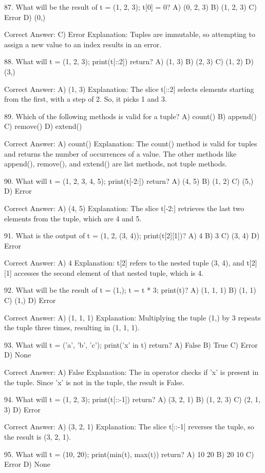 87. What will be the result of t = (1, 2, 3); t[0] = 0?
A) (0, 2, 3)
B) (1, 2, 3)
C) Error
D) (0,)

Correct Answer: C) Error
Explanation: Tuples are immutable, so attempting to assign a new value to an index results in an error.

88. What will t = (1, 2, 3); print(t[::2]) return?
A) (1, 3)
B) (2, 3)
C) (1, 2)
D) (3,)

Correct Answer: A) (1, 3)
Explanation: The slice t[::2] selects elements starting from the first, with a step of 2. So, it picks 1 and 3.

89. Which of the following methods is valid for a tuple?
A) count()
B) append()
C) remove()
D) extend()

Correct Answer: A) count()
Explanation: The count() method is valid for tuples and returns the number of occurrences of a value. The other methods like append(), remove(), and extend() are list methods, not tuple methods.

90. What will t = (1, 2, 3, 4, 5); print(t[-2:]) return?
A) (4, 5)
B) (1, 2)
C) (5,)
D) Error

Correct Answer: A) (4, 5)
Explanation: The slice t[-2:] retrieves the last two elements from the tuple, which are 4 and 5.

91. What is the output of t = (1, 2, (3, 4)); print(t[2][1])?
A) 4
B) 3
C) (3, 4)
D) Error

Correct Answer: A) 4
Explanation: t[2] refers to the nested tuple (3, 4), and t[2][1] accesses the second element of that nested tuple, which is 4.

92. What will be the result of t = (1,); t = t * 3; print(t)?
A) (1, 1, 1)
B) (1, 1)
C) (1,)
D) Error

Correct Answer: A) (1, 1, 1)
Explanation: Multiplying the tuple (1,) by 3 repeats the tuple three times, resulting in (1, 1, 1).

93. What will t = ('a', 'b', 'c'); print('x' in t) return?
A) False
B) True
C) Error
D) None

Correct Answer: A) False
Explanation: The in operator checks if 'x' is present in the tuple. Since 'x' is not in the tuple, the result is False.

94. What will t = (1, 2, 3); print(t[::-1]) return?
A) (3, 2, 1)
B) (1, 2, 3)
C) (2, 1, 3)
D) Error

Correct Answer: A) (3, 2, 1)
Explanation: The slice t[::-1] reverses the tuple, so the result is (3, 2, 1).

95. What will t = (10, 20); print(min(t), max(t)) return?
A) 10 20
B) 20 10
C) Error
D) None

